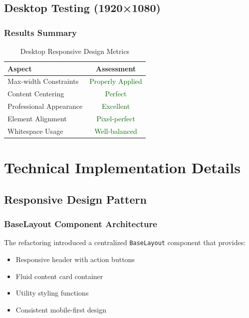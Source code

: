 \documentclass[11pt, a4paper]{report}
\begin{document}
\section{Desktop Testing (1920×1080)}

\subsection{Results Summary}

\begin{table}[H]
    \centering
    \caption{Desktop Responsive Design Metrics}
    \begin{tabular}{|l|c|}
        \hline
        \textbf{Aspect} & \textbf{Assessment} \\
        \hline
        Max-width Constraints & \textcolor{darkgreen}{Properly Applied} \\
        Content Centering & \textcolor{darkgreen}{Perfect} \\
        Professional Appearance & \textcolor{darkgreen}{Excellent} \\
        Element Alignment & \textcolor{darkgreen}{Pixel-perfect} \\
        Whitespace Usage & \textcolor{darkgreen}{Well-balanced} \\
        \hline
    \end{tabular}
\end{table}

\chapter{Technical Implementation Details}

\section{Responsive Design Pattern}

\subsection{BaseLayout Component Architecture}

The refactoring introduced a centralized \texttt{BaseLayout} component that provides:

\begin{itemize}
    \item Responsive header with action buttons
    \item Fluid content card container
    \item Utility styling functions
    \item Consistent mobile-first design
\end{itemize}
\end{document}
